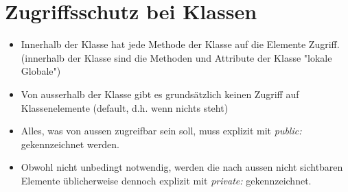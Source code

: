 \section{Zugriffsschutz bei Klassen}
\begin{itemize}
	\item Innerhalb der Klasse hat jede Methode der Klasse auf die Elemente Zugriff. (innerhalb der Klasse sind die Methoden und Attribute der Klasse "lokale Globale")
	\item Von ausserhalb der Klasse gibt es grundsätzlich keinen Zugriff auf Klassenelemente (default, d.h. wenn nichts steht)
	\item Alles, was von aussen zugreifbar sein soll, muss explizit mit \emph{public:} gekennzeichnet werden.
	\item Obwohl nicht unbedingt notwendig, werden die nach aussen nicht sichtbaren Elemente üblicherweise dennoch explizit mit \emph{private:} gekennzeichnet.
\end{itemize}

